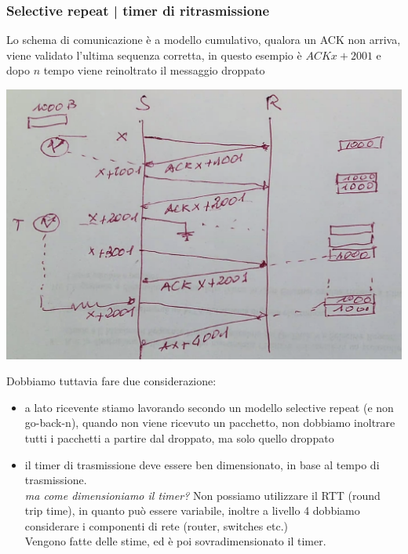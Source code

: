 \documentclass[11pt, oneside]{article}   	%
\begin{document}
\subsubsection*{Selective repeat | timer di ritrasmissione}
Lo schema di comunicazione è a modello cumulativo, qualora un ACK non arriva, viene validato l'ultima sequenza corretta, in questo esempio è $ACK x+2001$ e dopo $n$ tempo viene reinoltrato il messaggio droppato
\begin{center}
\includegraphics[scale=0.5]{t7}
\end{center}
Dobbiamo tuttavia fare due considerazione:\begin{itemize}
\item a lato ricevente stiamo lavorando secondo un modello selective repeat (e non go-back-n), quando non viene ricevuto un pacchetto, non dobbiamo inoltrare tutti i pacchetti a partire dal droppato, ma solo quello droppato
\item il timer di trasmissione deve essere ben dimensionato, in base al tempo di trasmissione. \\\emph{ma come dimensioniamo il timer?} Non possiamo utilizzare il RTT (round trip time), in quanto può essere variabile, inoltre a livello 4 dobbiamo considerare i componenti di rete (router, switches etc.)\\ Vengono fatte delle stime, ed è poi sovradimensionato il timer.
\end{itemize}
\end{document}
